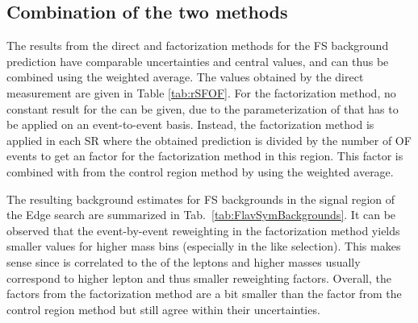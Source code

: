 \subsection{Combination of the two methods}\label{sec:rSFOFCombination}
The results from the direct and factorization methods for the FS background prediction have comparable uncertainties and central values, and can thus be combined using the weighted average. 
The \Rsfof values obtained by the direct measurement are given in Table \ref{tab:rSFOF}. 
For the factorization method, no constant result for the \Rsfof can be given, due to the parameterization of \rmue that has to be applied on an event-to-event basis.
Instead, the factorization method is applied in each SR where the obtained prediction is divided by the number of OF events to get an \Rsfof factor for the factorization method in this region. 
This factor is combined with \Rsfof from the control region method by using the weighted average.

The resulting background estimates for FS backgrounds in the signal region of the Edge search are summarized in Tab.~\ref{tab:FlavSymBackgrounds}.
It can be observed that the event-by-event reweighting in the factorization method yields smaller \Rsfof values for higher mass bins (especially in the \ttbar like selection). 
This makes sense since \mll is correlated to the \pt of the leptons and higher masses usually correspond to higher lepton \pt and thus smaller reweighting factors.
Overall, the \Rsfof factors from the factorization method are a bit smaller than the factor from the control region method but still agree within their uncertainties.



